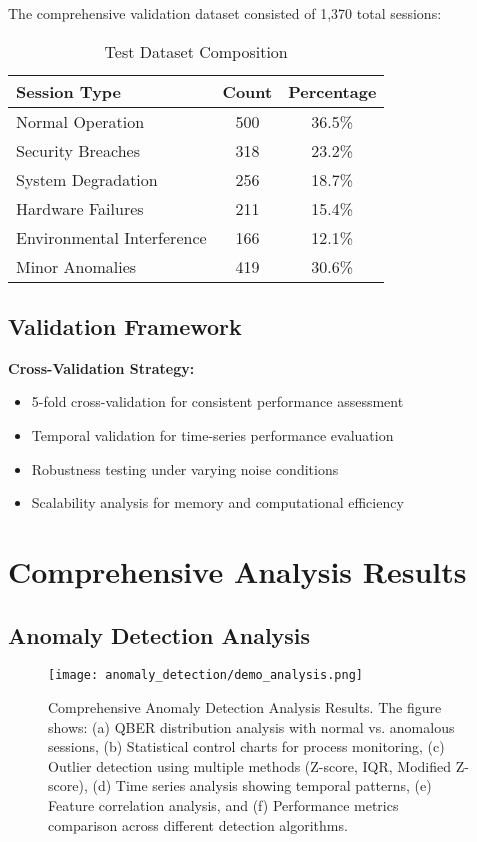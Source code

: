 \documentclass[12pt,a4paper]{article}
\begin{document}
The comprehensive validation dataset consisted of 1,370 total sessions:

\begin{table}[H]
\centering
\caption{Test Dataset Composition}
\begin{tabular}{@{}lcc@{}}
\toprule
\textbf{Session Type} & \textbf{Count} & \textbf{Percentage} \\
\midrule
Normal Operation & 500 & 36.5\% \\
Security Breaches & 318 & 23.2\% \\
System Degradation & 256 & 18.7\% \\
Hardware Failures & 211 & 15.4\% \\
Environmental Interference & 166 & 12.1\% \\
Minor Anomalies & 419 & 30.6\% \\
\bottomrule
\end{tabular}
\end{table}

\subsection{Validation Framework}

\textbf{Cross-Validation Strategy:}
\begin{itemize}
    \item 5-fold cross-validation for consistent performance assessment
    \item Temporal validation for time-series performance evaluation
    \item Robustness testing under varying noise conditions
    \item Scalability analysis for memory and computational efficiency
\end{itemize}

\section{Comprehensive Analysis Results}

\subsection{Anomaly Detection Analysis}

\begin{figure}[H]
\centering
\texttt{[image: anomaly\_detection/demo\_analysis.png]}
\caption{Comprehensive Anomaly Detection Analysis Results. The figure shows: (a) QBER distribution analysis with normal vs. anomalous sessions, (b) Statistical control charts for process monitoring, (c) Outlier detection using multiple methods (Z-score, IQR, Modified Z-score), (d) Time series analysis showing temporal patterns, (e) Feature correlation analysis, and (f) Performance metrics comparison across different detection algorithms.}
\label{fig:anomaly_analysis}
\end{figure}
\end{document}
